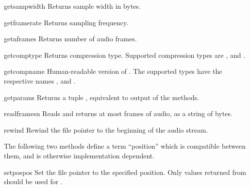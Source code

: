 \begin{methoddesc}[AU_read]{getsampwidth}{}
Returns sample width in bytes.
\end{methoddesc}

\begin{methoddesc}[AU_read]{getframerate}{}
Returns sampling frequency.
\end{methoddesc}

\begin{methoddesc}[AU_read]{getnframes}{}
Returns number of audio frames.
\end{methoddesc}

\begin{methoddesc}[AU_read]{getcomptype}{}
Returns compression type.
Supported compression types are ,  and .
\end{methoddesc}

\begin{methoddesc}[AU_read]{getcompname}{}
Human-readable version of . 
The supported types have the respective names ,  and .
\end{methoddesc}

\begin{methoddesc}[AU_read]{getparams}{}
Returns a tuple ,
equivalent to output of the  methods.
\end{methoddesc}

\begin{methoddesc}[AU_read]{readframes}{n}
Reads and returns at most  frames of audio, as a string of bytes.
\end{methoddesc}

\begin{methoddesc}[AU_read]{rewind}{}
Rewind the file pointer to the beginning of the audio stream.
\end{methoddesc}

The following two methods define a term ``position'' which is compatible
between them, and is otherwise implementation dependent.

\begin{methoddesc}[AU_read]{setpos}{pos}
Set the file pointer to the specified position.  Only values returned
from  should be used for .
\end{methoddesc}

